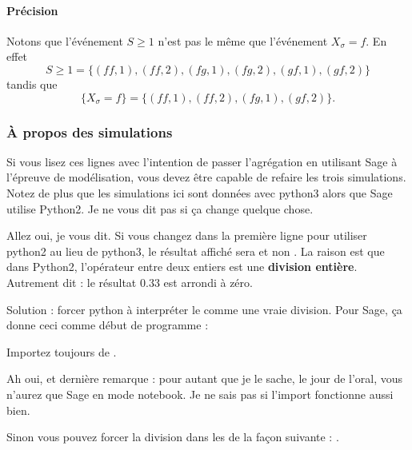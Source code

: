 \paragraph{Précision}
Notons que l'événement \( S\geq 1\) n'est pas le même que l'événement \( X_{\sigma}=f\). En effet
\begin{equation}
    S\geq 1=\{ (ff,1),(ff,2),(fg,1),(fg,2),(gf,1),(gf,2) \}
\end{equation}
tandis que
\begin{equation}
    \{ X_{\sigma}=f \}=\{ (ff,1),(ff,2),(fg,1),(gf,2) \}.
\end{equation}

\subsubsection{À propos des simulations}

Si vous lisez ces lignes avec l'intention de passer l'agrégation en utilisant Sage à l'épreuve de modélisation, vous devez être capable de refaire les trois simulations. Notez de plus que les simulations ici sont données avec python3 alors que Sage utilise Python2. Je ne vous dit pas si ça change quelque chose.

Allez oui, je vous dit. Si vous changez dans  la première ligne pour utiliser python2 au lieu de python3, le résultat affiché sera  et non . La raison est que dans Python2, l'opérateur \info{/} entre deux entiers est une {\bf division entière}. Autrement dit : le résultat \( 0.33\) est arrondi à zéro.

Solution : forcer python à interpréter le \info{/} comme une vraie division. Pour Sage, ça donne ceci comme début de programme :



Importez toujours  de .

Ah oui, et dernière remarque : pour autant que je le sache, le jour de l'oral, vous n'aurez que Sage en mode notebook. Je ne sais pas si l'import fonctionne aussi bien.

Sinon vous pouvez forcer la division dans les  de la façon suivante : .

